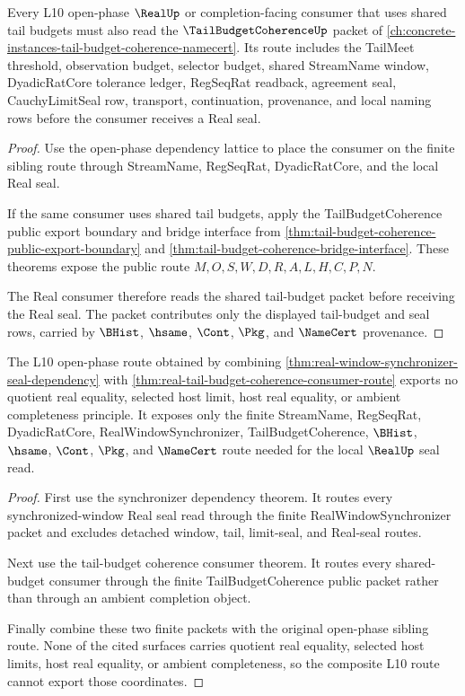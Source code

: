\begin{theorem}
\label{thm:real-tail-budget-coherence-consumer-route}
Every L10 open-phase $\RealUp$ or completion-facing consumer that uses shared tail budgets must also read the $\TailBudgetCoherenceUp$ packet of \autoref{ch:concrete-instances-tail-budget-coherence-namecert}. Its route includes the TailMeet threshold, observation budget, selector budget, shared StreamName window, DyadicRatCore tolerance ledger, RegSeqRat readback, agreement seal, CauchyLimitSeal row, transport, continuation, provenance, and local naming rows before the consumer receives a Real seal.
\end{theorem}
\begin{proof}
Use the open-phase dependency lattice to place the consumer on the finite sibling route through StreamName, RegSeqRat, DyadicRatCore, and the local Real seal.

If the same consumer uses shared tail budgets, apply the TailBudgetCoherence public export boundary and bridge interface from \autoref{thm:tail-budget-coherence-public-export-boundary} and \autoref{thm:tail-budget-coherence-bridge-interface}. These theorems expose the public route $M,O,S,W,D,R,A,L,H,C,P,N$.

The Real consumer therefore reads the shared tail-budget packet before receiving the Real seal. The packet contributes only the displayed tail-budget and seal rows, carried by $\BHist$, $\hsame$, $\Cont$, $\Pkg$, and $\NameCert$ provenance.
\end{proof}

\begin{theorem}
\label{thm:real-l10-synchronizer-nonescape}
The L10 open-phase route obtained by combining \autoref{thm:real-window-synchronizer-seal-dependency} with \autoref{thm:real-tail-budget-coherence-consumer-route} exports no quotient real equality, selected host limit, host real equality, or ambient completeness principle. It exposes only the finite StreamName, RegSeqRat, DyadicRatCore, RealWindowSynchronizer, TailBudgetCoherence, $\BHist$, $\hsame$, $\Cont$, $\Pkg$, and $\NameCert$ route needed for the local $\RealUp$ seal read.
\end{theorem}
\begin{proof}
First use the synchronizer dependency theorem. It routes every synchronized-window Real seal read through the finite RealWindowSynchronizer packet and excludes detached window, tail, limit-seal, and Real-seal routes.

Next use the tail-budget coherence consumer theorem. It routes every shared-budget consumer through the finite TailBudgetCoherence public packet rather than through an ambient completion object.

Finally combine these two finite packets with the original open-phase sibling route. None of the cited surfaces carries quotient real equality, selected host limits, host real equality, or ambient completeness, so the composite L10 route cannot export those coordinates.
\end{proof}

